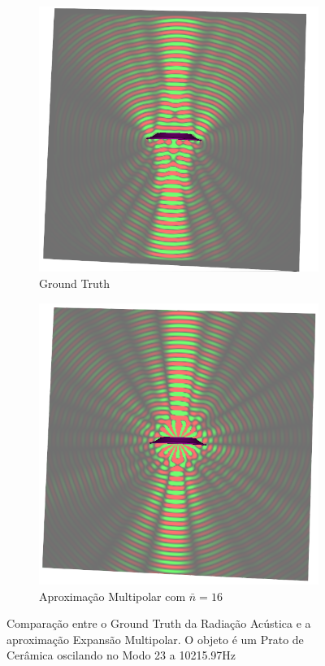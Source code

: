 \begin{figure}[ht]
\centering
\begin{subfigure}{0.5\textwidth}
	\centering
	\includegraphics[width=\textwidth]{algorithm/plate_mode_a.png}
	\caption{Ground Truth}\label{fig:acoustic_transfer_ground_truth}
\end{subfigure}%
\begin{subfigure}{0.5\textwidth}
	\centering
	\includegraphics[width=\textwidth]{algorithm/plate_mode_b.png}
	\caption{Aproximação Multipolar com $\bar{n} = 16$}
	\label{fig:acoustic_transfer_multipole_estimate}
\end{subfigure}
\caption[Comparação entre o Ground Truth da Radiação Acústica e a aproximação Expansão Multipolar]{Comparação entre o Ground Truth da Radiação Acústica e a aproximação Expansão Multipolar. O objeto é um Prato de Cerâmica oscilando no Modo 23 a 10215.97Hz}
\label{fig:multipole_comparison}
\end{figure}